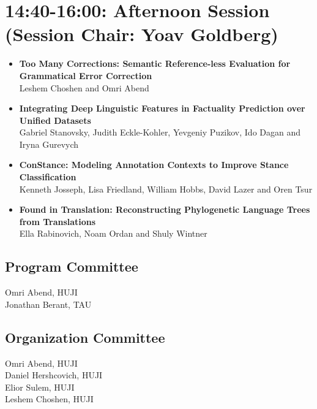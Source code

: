 \documentclass[a0,portrait]{a0poster}
\begin{document}
\begin{minipage}{.83\textwidth}
\section*{14:40-16:00: Afternoon Session (Session Chair: Yoav Goldberg)}

\begin{itemize}
\item\LARGE
\textbf{Too Many Corrections: Semantic Reference-less Evaluation for
Grammatical Error Correction}\\
\Large Leshem Choshen and Omri Abend
\item\LARGE
\textbf{Integrating Deep Linguistic Features in Factuality Prediction
over Unified Datasets}\\
\Large Gabriel Stanovsky, Judith Eckle-Kohler, Yevgeniy Puzikov, Ido Dagan
and Iryna Gurevych
\item\LARGE
\textbf{ConStance: Modeling Annotation Contexts to Improve Stance
Classification}\\
\Large Kenneth Josseph, Lisa Friedland, William Hobbs, David Lazer and Oren
Tsur
\item\LARGE
\textbf{Found in Translation: Reconstructing Phylogenetic Language
Trees from Translations}\\
\Large Ella Rabinovich, Noam Ordan and Shuly Wintner
\end{itemize}

\end{minipage}
\begin{adjustbox}{margin=1em,minipage=.15\textwidth,frame}
\large
\subsection*{Program Committee}
Omri Abend, HUJI\\
Jonathan Berant, TAU\\

\subsection*{Organization Committee}
Omri Abend, HUJI\\
Daniel Hershcovich, HUJI\\
Elior Sulem, HUJI\\
Leshem Choshen, HUJI
\end{adjustbox}
\end{document}
